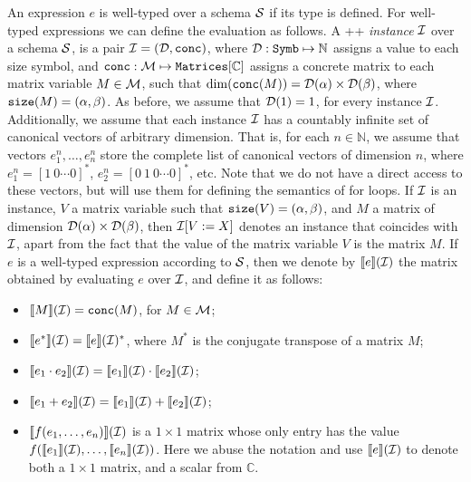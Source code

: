 An expression $e$ is well-typed over a schema $\mathcal{S}$ if its type is defined. For well-typed expressions we can define the evaluation as follows.
%
A \lang++ {\em instance} $\mathcal{I}$ over a schema $\mathcal{S}$, is a pair $\mathcal{I} = (\mathcal{D},\texttt{conc})$, where $\mathcal{D} : \texttt{Symb} \mapsto \mathbb{N}$ assigns a value to each size symbol, and $\texttt{conc} : \mathcal{M} \mapsto \texttt{Matrices}[\mathbb{C}]$ assigns a concrete matrix to each matrix variable $M\in \mathcal{M}$, such that $\dim(\texttt{conc}(M)) = \mathcal{D}(\alpha)\times \mathcal{D}(\beta)$, where $\texttt{size}(M) = (\alpha,\beta)$. As before, we assume that $\mathcal{D}(1) = 1$, for every instance $\mathcal{I}$. Additionally, we assume that each instance $\mathcal{I}$ has a countably infinite set of canonical vectors of arbitrary dimension. That is, for each $n\in \mathbb{N}$, we assume that vectors $e_1^n,\ldots ,e_n^n$ store the complete list of canonical vectors of dimension $n$, where $e_1^n = [1\ 0 \cdots 0]^*$, $e_2^n = [0\ 1\ 0 \cdots 0]^*$, etc. Note that we do not have a direct access to these vectors, but will use them for defining the semantics of for loops. 
If $\mathcal{I}$ is an instance, $V$ a matrix variable such that $\texttt{size}(V)= (\alpha,\beta)$, and $M$ a matrix of dimension $\mathcal{D}(\alpha)\times \mathcal{D}(\beta)$, then $\mathcal{I}[V := X]$ denotes an instance that coincides with $\mathcal{I}$, apart from the fact that the value of the matrix variable $V$ is the matrix $M$. 
If $e$ is a well-typed expression according to $\mathcal{S}$, then we denote by $\llbracket e \rrbracket(\mathcal{I})$ the matrix obtained by evaluating $e$ over $\mathcal{I}$, and define it as follows:
\begin{itemize}
\item $\llbracket M \rrbracket(\mathcal{I}) = \texttt{conc}(M)$, for $M\in \mathcal{M}$;
\item $\llbracket e^* \rrbracket(\mathcal{I}) = \llbracket e \rrbracket(\mathcal{I})^*$, where $M^*$ is the conjugate transpose of a matrix $M$;
\item $\llbracket e_1\cdot e_2 \rrbracket(\mathcal{I}) = \llbracket e_1 \rrbracket(\mathcal{I}) \cdot \llbracket e_2 \rrbracket(\mathcal{I})$;
\item $\llbracket e_1 + e_2 \rrbracket(\mathcal{I}) = \llbracket e_1 \rrbracket(\mathcal{I}) + \llbracket e_2 \rrbracket(\mathcal{I})$;
\item $\llbracket f(e_1,\ldots ,e_n) \rrbracket(\mathcal{I})$ is a $1\times 1$ matrix whose only entry has the value $f(\llbracket e_1 \rrbracket(\mathcal{I}),\ldots ,\llbracket e_n \rrbracket(\mathcal{I}))$. Here we abuse the notation and use $\llbracket e \rrbracket(\mathcal{I})$ to denote both a $1\times 1$ matrix, and a scalar from $\mathbb{C}$.
\end{itemize}

